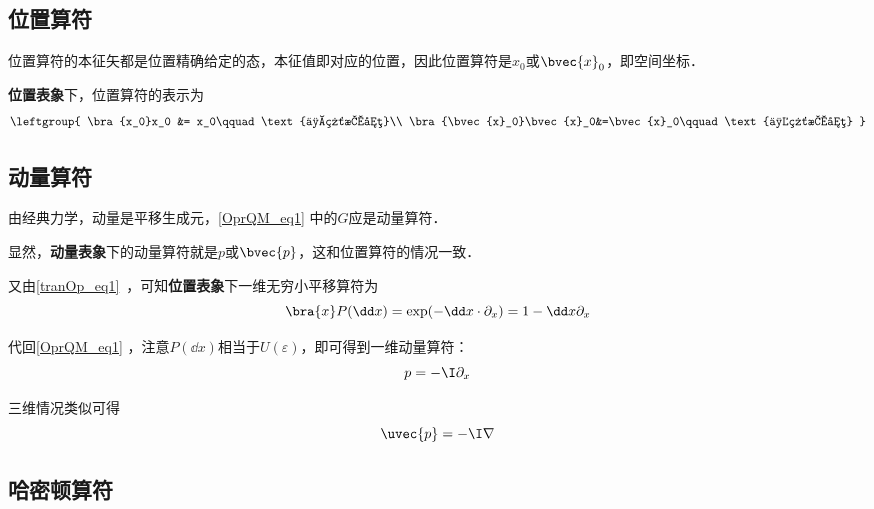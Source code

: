 \subsection{位置算符}

位置算符的本征矢都是位置精确给定的态，本征值即对应的位置，因此位置算符是$x_0$或$\bvec{x}_0$，即空间坐标．

\textbf{位置表象}下，位置算符的表示为
\begin{equation}
\leftgroup{
    \bra{x_0}x_0 &= x_0\qquad\text{一维情况}\\
    \bra{\bvec{x}_0}\bvec{x}_0&=\bvec{x}_0\qquad\text{三维情况}
    }
\end{equation}







\subsection{动量算符}


由经典力学，动量是平移生成元，\autoref{OprQM_eq1} 中的$G$应是动量算符．

显然，\textbf{动量表象}下的动量算符就是$p$或$\bvec{p}$，这和位置算符的情况一致．

又由\autoref{tranOp_eq1}~，可知\textbf{位置表象}下一维无穷小平移算符为
\begin{equation}
\bra{x}P(\dd x) = \exp(-\dd x \cdot \partial_x) = 1-\dd x\partial_x
\end{equation}

代回\autoref{OprQM_eq1} ，注意$P(\dd x)$相当于$U(\varepsilon)$，即可得到一维动量算符：
\begin{equation}
p  = -\I\partial_x
\end{equation}

三维情况类似可得
\begin{equation}
\uvec{p} = -\I\nabla
\end{equation}




\subsection{哈密顿算符}

